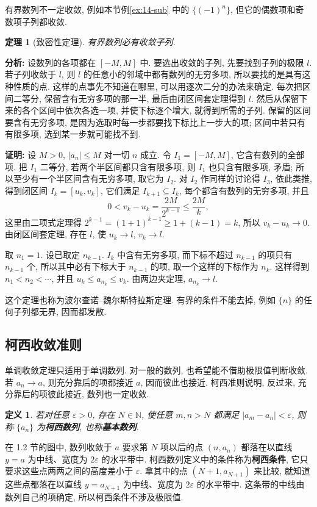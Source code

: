 \documentclass[UTF8,openany]{ctexbook}
\theoremstyle{chinesetextbook}
\newtheorem{definition}{定义}[section]
\newtheorem{theorem}{定理}[section]
\newenvironment{cnproof}{\par\indent\textbf{证明:} \ignorespaces}{\par}
\begin{document}
有界数列不一定收敛, 例如本节例\ref{ex:14-sub} 中的 $\{(-1)^n\}$, 但它的偶数项和奇数项子列都收敛.
\begin{theorem}[致密性定理]
有界数列必有收敛子列.
\end{theorem}
\par\indent\textbf{分析:} 设数列的各项都在 $[-M,M]$ 中. 要选出收敛的子列, 先要找到子列的极限 $l$. 若子列收敛于 $l$, 则 $l$ 的任意小的邻域中都有数列的无穷多项, 所以要找的是具有这种性质的点. 这样的点事先不知道在哪里, 可以用逐次二分的办法来确定. 每次把区间二等分, 保留含有无穷多项的那一半, 最后由闭区间套定理得到 $l$. 然后从保留下来的各个区间中依次各选一项, 并使下标逐个增大, 就得到所需的子列. 保留的区间要含有无穷多项, 是因为选取时每一步都要找下标比上一步大的项; 区间中若只有有限多项, 选到某一步就可能找不到.
\begin{cnproof}
设 $M>0$, $|a_n|\le M$ 对一切 $n$ 成立. 令 $I_1=[-M,M]$, 它含有数列的全部项. 把 $I_1$ 二等分, 若两个半区间都只含有限多项, 则 $I_1$ 也只含有限多项, 矛盾; 所以至少有一个半区间含有无穷多项, 取它为 $I_2$. 对 $I_2$ 作同样的讨论得 $I_3$, 依此类推, 得到闭区间 $I_k=[u_k,v_k]$, 它们满足 $I_{k+1}\subseteq I_k$, 每个都含有数列的无穷多项, 并且
\[
0<v_k-u_k=\frac{2M}{2^{k-1}}\le\frac{2M}k,
\]
这里由二项式定理得 $2^{k-1}=(1+1)^{k-1}\ge1+(k-1)=k$, 所以 $v_k-u_k\to0$. 由闭区间套定理, 存在 $l$, 使 $u_k\to l$, $v_k\to l$.

取 $n_1=1$. 设已取定 $n_{k-1}$. $I_k$ 中含有无穷多项, 而下标不超过 $n_{k-1}$ 的项只有 $n_{k-1}$ 个, 所以其中必有下标大于 $n_{k-1}$ 的项, 取一个这样的下标作为 $n_k$. 这样得到 $n_1<n_2<\cdots$, 并且 $u_k\le a_{n_k}\le v_k$. 由两边夹定理, $a_{n_k}\to l$.
\end{cnproof}
这个定理也称为波尔查诺--魏尔斯特拉斯定理. 有界的条件不能去掉, 例如 $\{n\}$ 的任何子列都无界, 因而都发散.
\subsection{柯西收敛准则}
单调收敛定理只适用于单调数列. 对一般的数列, 也希望能不借助极限值判断收敛. 若 $a_n\to a$, 则充分靠后的项都接近 $a$, 因而彼此也接近. 柯西准则说明, 反过来, 充分靠后的项彼此接近, 数列也一定收敛.
\begin{definition}
若对任意 $\varepsilon>0$, 存在 $N\in\mathbb N$, 使任意 $m,n>N$ 都满足 $|a_m-a_n|<\varepsilon$, 则称 $\{a_n\}$ 为\textbf{柯西数列}, 也称\textbf{基本数列}.
\end{definition}
在 1.2 节的图中, 数列收敛于 $a$ 要求第 $N$ 项以后的点 $(n,a_n)$ 都落在以直线 $y=a$ 为中线、宽度为 $2\varepsilon$ 的水平带中. 柯西数列定义中的条件称为\textbf{柯西条件}, 它只要求这些点两两之间的高度差小于 $\varepsilon$. 拿其中的点 $(N+1,a_{N+1})$ 来比较, 就知道这些点都落在以直线 $y=a_{N+1}$ 为中线、宽度为 $2\varepsilon$ 的水平带中. 这条带的中线由数列自己的项确定, 所以柯西条件不涉及极限值.
\end{document}

